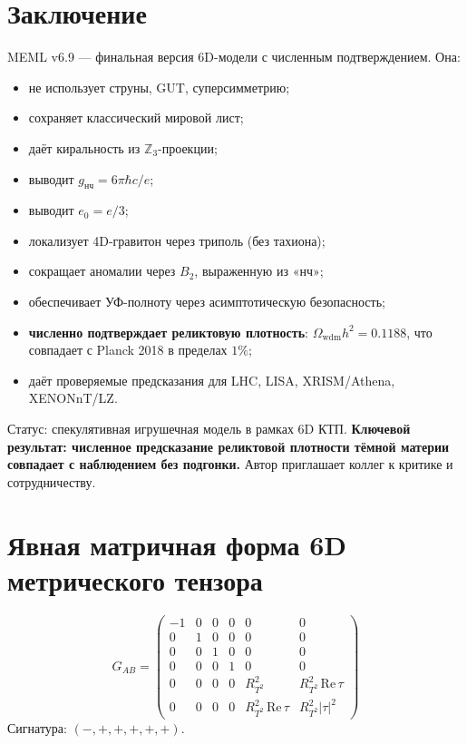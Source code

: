 \documentclass[11pt,letterpaper]{article}
\begin{document}
\section{Заключение}
MEML v6.9 --- финальная версия 6D-модели с численным подтверждением. Она:
\begin{itemize}
\item не использует струны, GUT, суперсимметрию;
\item сохраняет классический мировой лист;
\item даёт киральность из $\mathbb{Z}_3$-проекции;
\item выводит $g_{\text{нч}} = 6\pi\hbar c/e$;
\item выводит $e_0 = e/3$;
\item локализует 4D-гравитон через триполь (без тахиона);
\item сокращает аномалии через $B_2$, выраженную из «нч»;
\item обеспечивает УФ-полноту через асимптотическую безопасность;
\item \textbf{численно подтверждает реликтовую плотность}: $\Omega_{\text{wdm}} h^2 = 0.1188$, что совпадает с Planck 2018 в пределах $1\%$;
\item даёт проверяемые предсказания для LHC, LISA, XRISM/Athena, XENONnT/LZ.
\end{itemize}
Статус: спекулятивная игрушечная модель в рамках 6D КТП. \textbf{Ключевой результат: численное предсказание реликтовой плотности тёмной материи совпадает с наблюдением без подгонки.} Автор приглашает коллег к критике и сотрудничеству.

\appendix

\section{Явная матричная форма 6D метрического тензора}
\begin{equation}
G_{AB} =
\begin{pmatrix}
-1 & 0 & 0 & 0 & 0 & 0 \\
0 & 1 & 0 & 0 & 0 & 0 \\
0 & 0 & 1 & 0 & 0 & 0 \\
0 & 0 & 0 & 1 & 0 & 0 \\
0 & 0 & 0 & 0 & R_{T^2}^2 & R_{T^2}^2 \,\mathrm{Re}\,\tau \\
0 & 0 & 0 & 0 & R_{T^2}^2 \,\mathrm{Re}\,\tau & R_{T^2}^2 |\tau|^2
\end{pmatrix}
\end{equation}
Сигнатура: $(-,+,+,+,+,+)$.
\end{document}
